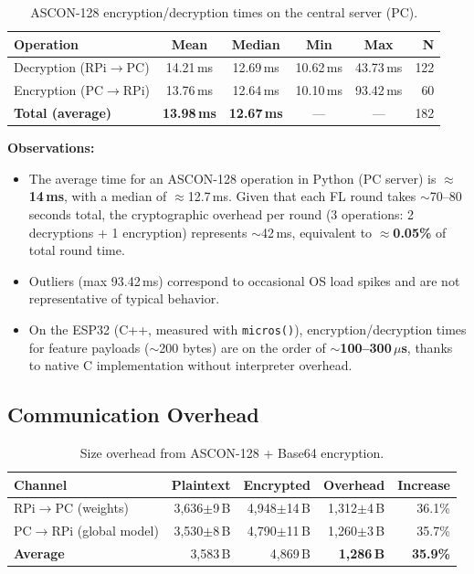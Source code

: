\begin{table}[H]
\centering
\caption{ASCON-128 encryption/decryption times on the central server (PC).}
\label{tab:ascon_time}
\small
\begin{tabular}{l c c c c r}
\toprule
\textbf{Operation} & \textbf{Mean} & \textbf{Median} & \textbf{Min} & \textbf{Max} & \textbf{N} \\
\midrule
Decryption (RPi$\to$PC) & 14.21\,ms & 12.69\,ms & 10.62\,ms & 43.73\,ms & 122 \\
Encryption (PC$\to$RPi)  & 13.76\,ms & 12.64\,ms & 10.10\,ms & 93.42\,ms &  60 \\
\midrule
\textbf{Total (average)} & \textbf{13.98\,ms} & \textbf{12.67\,ms} & --- & --- & 182 \\
\bottomrule
\end{tabular}
\end{table}

\textbf{Observations:}
\begin{itemize}
    \item The average time for an ASCON-128 operation in Python (PC server) is \textbf{$\approx$14\,ms}, with a median of $\approx$12.7\,ms. Given that each FL round takes $\sim$70--80 seconds total, the cryptographic overhead per round (3 operations: 2 decryptions + 1 encryption) represents $\sim$42\,ms, equivalent to \textbf{$\approx$0.05\%} of total round time.
    \item Outliers (max 93.42\,ms) correspond to occasional OS load spikes and are not representative of typical behavior.
    \item On the ESP32 (C++, measured with \texttt{micros()}), encryption/decryption times for feature payloads ($\sim$200 bytes) are on the order of \textbf{$\sim$100--300\,$\mu$s}, thanks to native C implementation without interpreter overhead.
\end{itemize}

\subsection{Communication Overhead}

\begin{table}[H]
\centering
\caption{Size overhead from ASCON-128 + Base64 encryption.}
\label{tab:ascon_size}
\small
\begin{tabular}{l r r r r}
\toprule
\textbf{Channel} & \textbf{Plaintext} & \textbf{Encrypted} & \textbf{Overhead} & \textbf{Increase} \\
\midrule
RPi$\to$PC (weights)       & 3,636$\pm$9\,B  & 4,948$\pm$14\,B  & 1,312$\pm$4\,B  & 36.1\% \\
PC$\to$RPi (global model)  & 3,530$\pm$8\,B  & 4,790$\pm$11\,B  & 1,260$\pm$3\,B  & 35.7\% \\
\midrule
\textbf{Average}           & 3,583\,B         & 4,869\,B          & \textbf{1,286\,B} & \textbf{35.9\%} \\
\bottomrule
\end{tabular}
\end{table}

